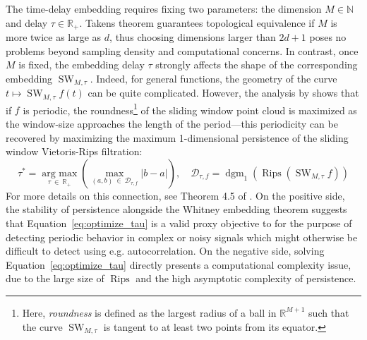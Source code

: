 \documentclass[pdflatex,sn-mathphys-num]{sn-jnl}
\begin{document}
The time-delay embedding requires fixing two parameters: the dimension \(M \in \mathbb{N}\) and delay \(\tau \in \mathbb{R}_{+}\). Takens theorem guarantees topological equivalence if \(M\) is more twice as large as \(d\), thus choosing dimensions larger than \(2d + 1\) poses no problems beyond sampling density and computational concerns. In contrast, once \(M\) is fixed, the embedding delay \(\tau\) strongly affects the shape of the corresponding embedding \(\operatorname{SW}_{M,\tau}\). Indeed, for general functions, the geometry of the curve \(t \mapsto \operatorname{SW}_{M,\tau}f(t)\) can be quite complicated. However, the analysis by \cite{perea2015sliding} shows that if \(f\) is periodic, the roundness\footnote{Here, \emph{roundness} is defined as the largest radius of a ball in \(\mathbb{R}^{M + 1}\) such that the curve \(\operatorname{SW}_{M,\tau}\) is tangent to at least two points from its equator.} of the sliding window point cloud is maximized as the window-size approaches the length of the period---this periodicity can be recovered by maximizing the maximum 1-dimensional persistence of the sliding window Vietoris-Rips filtration:
\[\label{eq:optimize_tau}
	\tau^{\ast} = \operatorname{arg\ max}\limits_{\tau\: \in \:\mathbb{R}_{+}}\left( \max\limits_{(a,b)\: \in \:\mathcal{D}_{\tau,f}}\left| {b - a} \right| \right),
	\quad
	\mathcal{D}_{\tau,f} = \operatorname{dgm}_{1}\left( \operatorname{Rips}(\operatorname{SW}_{M,\tau}f) \right)
\]
For more details on this connection, see Theorem 4.5 of \cite{perea2015sliding}. On the positive side, the stability of persistence alongside the Whitney embedding theorem suggests that Equation~\ref{eq:optimize_tau} is a valid proxy objective to for the purpose of detecting periodic behavior in complex or noisy signals which might otherwise be difficult to detect using e.g. autocorrelation. On the negative side, solving Equation~\ref{eq:optimize_tau} directly presents a computational complexity issue, due to the large size of \(\operatorname{Rips}\) and the high asymptotic complexity of persistence.
\end{document}
